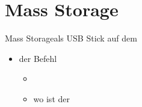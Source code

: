 \section{Mass Storage}
\begin{frame}{Mass Storage}{\beaglebone als USB Stick auf dem \host} 
 \begin{itemize}
  \item der Befehl 
  \begin{itemize}
   \item {}
   \item wo ist der 
  \end{itemize}
 \end{itemize}
\end{frame}
